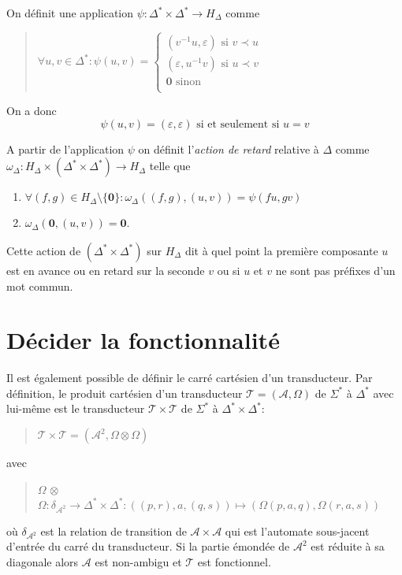 	On définit une application $\psi : \Delta^* \times \Delta^* \to H_\Delta$ comme
	
	\begin{quotation}
		$\forall u,v \in \Delta^* : \psi(u,v) = \begin{cases}
			(v^{-1}u, \varepsilon) \text{ si } v \prec u \\
			(\varepsilon, u^{-1}v) \text{ si } u \prec v \\
			\mathbf{0} \text{ sinon}  \\
		\end{cases}$
	\end{quotation}
	
	On a donc 
	\begin{equation}
		\psi(u,v) = (\varepsilon, \varepsilon) \text{ si et seulement si } u = v
		\label{eq}
	\end{equation}
	
	A partir de l'application $\psi$ on définit l'\emph{action de retard} relative à $\Delta$ comme $\omega_\Delta : H_\Delta \times (\Delta^* \times \Delta^*) \to H_\Delta$ telle que
	\begin{enumerate}
		\item $\forall (f,g) \in H_\Delta \setminus \{\mathbf{0}\} : \omega_\Delta((f,g),(u,v)) = \psi(fu,gv)$
		\item $\omega_\Delta(\mathbf{0}, (u,v)) = \mathbf{0}$. \\
	\end{enumerate}
	
	Cette action de $(\Delta^* \times \Delta^*)$ sur $H_\Delta$ dit à quel point la première composante $u$ est en avance ou en retard sur la seconde $v$ ou si $u$ et $v$ ne sont pas préfixes d'un mot commun.

\section{Décider la fonctionnalité}
	
	Il est également possible de définir le carré cartésien d'un transducteur. Par définition, le produit cartésien d'un transducteur $\mathscr{T} = (\mathscr{A}, \Omega)$ de $\Sigma^*$ à $\Delta^*$ avec lui-même est le transducteur $\mathscr{T} \times \mathscr{T}$ de $\Sigma^*$ à $\Delta^* \times \Delta^*$:
	\begin{quotation}
		$\mathscr{T} \times \mathscr{T} = (\mathscr{A}^2, \Omega \otimes \Omega)$
	\end{quotation}
	avec
	\begin{quotation}
		$\Omega$ $\otimes$ $\Omega : \delta_{\mathscr{A}^2} \to \Delta^* \times \Delta^* : ((p,r),a,(q,s)) \mapsto (\Omega(p,a,q),\Omega(r,a,s))$
	\end{quotation}
	où $\delta_{\mathscr{A}^2}$ est la relation de transition de $\mathscr{A} \times \mathscr{A}$ qui est l'automate sous-jacent d'entrée du carré du transducteur. Si la partie émondée de $\mathscr{A}^2$ est réduite à sa diagonale alors $\mathscr{A}$ est non-ambigu et $\mathscr{T}$ est fonctionnel.
	

